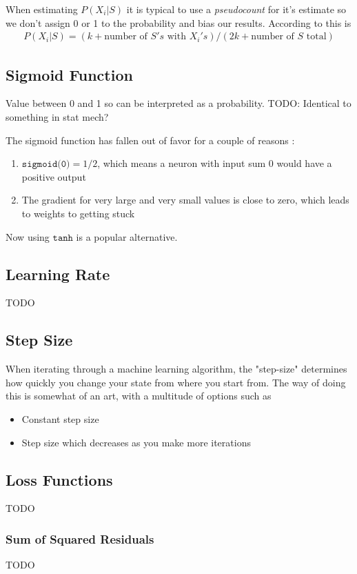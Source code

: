 When estimating $P(X_i|S)$ it is typical to use a \textit{pseudocount} for it's estimate so we don't assign 0 or 1 to the probability and bias our results. According to \cite{sutton} this is
\begin{align}
	P(X_i|S) = (k+\textrm{number~of~} S's\textrm{~with~} X_i's) / (2k+\textrm{number~of~} S \textrm{~total})
\end{align}


\subsection{Sigmoid Function}
Value between 0 and 1 so can be interpreted as a probability. TODO: Identical to something in stat mech?

The sigmoid function has fallen out of favor for a couple of reasons \cite{grus}:
\begin{enumerate}
	\item $\texttt{sigmoid(0)} = 1/2$, which means a neuron with input sum 0 would have a positive output
	\item The gradient for very large and very small values is close to zero, which leads to weights to getting stuck
\end{enumerate}
Now using $\texttt{tanh}$ is a popular alternative.


\subsection{Learning Rate}
TODO

\subsection{Step Size}
When iterating through a machine learning algorithm, the "step-size" determines how quickly you change your state from where you start from. The way of doing this is somewhat of an art, with a multitude of options such as 
\begin{itemize}
	\item Constant step size
	\item Step size which decreases as you make more iterations
\end{itemize}

\subsection{Loss Functions}
TODO
\subsubsection{Sum of Squared Residuals}
TODO


